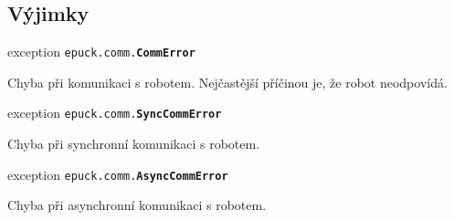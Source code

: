 \documentclass[12pt,notitlepage]{report}
\newcommand{\code}[1]{\texttt{\small #1}}
\newenvironment{popis}%
{\begin{list}{}%
         {\setlength{\leftmargin}{0.5cm}\setlength{\topsep}{1pt}
          \setlength{\itemsep}{0.1cm} \setlength{\parsep}{0.2cm}}%
         \item[]%
}
{\end{list}}
\begin{document}
\subsection{Výjimky}

exception \code{epuck.comm.{\bf CommError}}
\begin{popis}
Chyba při komunikaci s robotem. Nejčastější příčinou je, že robot neodpovídá.
\end{popis}

\vskip5mm \noindent exception \code{epuck.comm.{\bf SyncCommError}}
\begin{popis}
Chyba při synchronní komunikaci s robotem.
\end{popis}

\vskip5mm \noindent exception \code{epuck.comm.{\bf AsyncCommError}}
\begin{popis}
Chyba při asynchronní komunikaci s robotem.
\end{popis}








\end{document}
